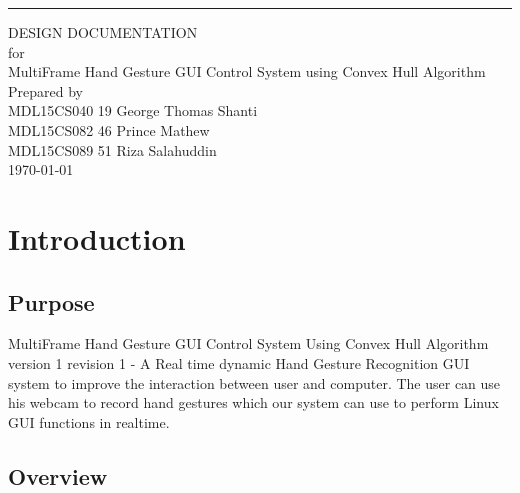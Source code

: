 \documentclass{scrreprt}
\date{}
\begin{document}
\begin{flushright}
    \rule{16cm}{5pt}\vskip1cm
    \begin{bfseries}
        \Huge{DESIGN DOCUMENTATION}\\
        \vspace{1.9cm}
        for\\
        \vspace{1.9cm}
        MultiFrame Hand Gesture GUI Control System using Convex Hull Algorithm\\
        \vspace{1.9cm}
        \LARGE
        Prepared by \\MDL15CS040 19 George Thomas Shanti
        \\MDL15CS082 46 Prince Mathew
        \\MDL15CS089 51 Riza Salahuddin\\
        \vspace{1.9cm}
        \today\\
    \end{bfseries}
\end{flushright}

\tableofcontents

\newpage
\chapter{Introduction}
\section{Purpose}
MultiFrame Hand Gesture GUI Control System Using Convex Hull Algorithm version 1 revision 1 - A Real time dynamic Hand Gesture Recognition GUI system to improve the interaction between user and computer. The user can use his webcam to record hand gestures which our system can use to perform Linux GUI functions in realtime.

\section{Overview}
\end{document}
